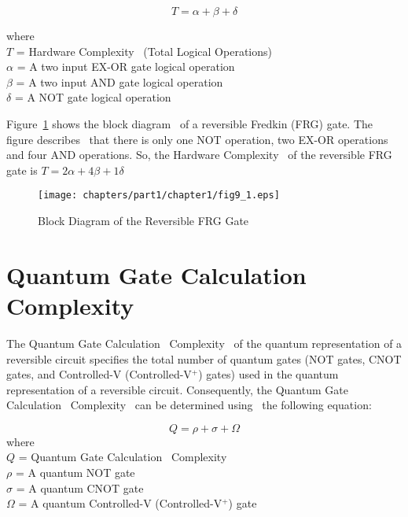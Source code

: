 \begin{equation}
T=\alpha+\beta+\delta
\end{equation}

\noindent where\\
$T$ = Hardware Complexity~ (Total Logical Operations)\\
$\alpha$ = A two input EX-OR gate logical operation \\
$\beta$ = A two input AND gate logical operation \\
$\delta$ = A NOT gate logical operation

\begin{example}\textnormal{
Figure~\ref{fig:p1_c1_fig9_1} shows the block diagram~ of a reversible Fredkin (FRG) gate. The figure describes~ that there is only one NOT operation, two EX-OR operations and four AND operations. So, the Hardware Complexity~ of the reversible FRG gate is $T= 2\alpha+4\beta+1\delta$}
\end{example}
\begin{figure}[H]
\centering
\texttt{[image: chapters/part1/chapter1/fig9\_1.eps]}
\caption{Block Diagram of the Reversible FRG Gate}
\label{fig:p1_c1_fig9_1}
\end{figure}

\section{Quantum Gate Calculation~ Complexity}
The Quantum Gate Calculation~ Complexity~ of the quantum representation of a reversible circuit specifies the total number of quantum gates (NOT gates, CNOT gates, and Controlled-V (Controlled-V$^+$) gates) used in the quantum representation of a reversible circuit. Consequently, the Quantum Gate Calculation~ Complexity~ can be determined using~ the following equation:


\begin{equation}
Q=\rho+\sigma+\Omega
\end{equation}
\noindent where\\
$Q$ = Quantum Gate Calculation~ Complexity\\
$\rho$ = A quantum NOT gate \\
$\sigma$ = A quantum CNOT gate \\
$\Omega$ = A quantum Controlled-V (Controlled-V$^+$) gate


